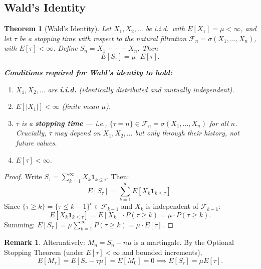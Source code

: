 \documentclass[12pt, a4paper]{article}
\theoremstyle{definition}
\newtheorem{remark}{Remark}[section]
\theoremstyle{plain}
\newtheorem{theorem}{Theorem}[section]
\begin{document}
\subsection{Wald's Identity}

\begin{theorem}[Wald's Identity]
Let $X_1, X_2, \ldots$ be i.i.d.\ with $E[X_1] = \mu < \infty$, and let $\tau$ be a stopping time with respect to the natural filtration $\mathcal{F}_n = \sigma(X_1,\ldots,X_n)$, with $E[\tau] < \infty$. Define $S_n = X_1 + \cdots + X_n$. Then
\[
  E[S_\tau] = \mu \cdot E[\tau].
\]

\textbf{Conditions required for Wald's identity to hold:}
\begin{enumerate}[label=(\roman*)]
  \item $X_1, X_2, \ldots$ are \textbf{i.i.d.} (identically distributed and mutually independent).
  \item $E[|X_1|] < \infty$ (finite mean $\mu$).
  \item $\tau$ is a \textbf{stopping time} — i.e., $\{\tau = n\} \in \mathcal{F}_n = \sigma(X_1,\ldots,X_n)$ for all $n$. Crucially, $\tau$ may depend on $X_1, X_2, \ldots$ but only through their history, not future values.
  \item $E[\tau] < \infty$.
\end{enumerate}
\end{theorem}

\begin{proof}
Write $S_\tau = \sum_{k=1}^\infty X_k \mathbf{1}_{k \leq \tau}$. Then:
\[
  E[S_\tau] = \sum_{k=1}^\infty E[X_k \mathbf{1}_{k \leq \tau}].
\]
Since $\{\tau \geq k\} = \{\tau \leq k-1\}^c \in \mathcal{F}_{k-1}$ and $X_k$ is independent of $\mathcal{F}_{k-1}$:
\[
  E[X_k \mathbf{1}_{k \leq \tau}] = E[X_k] \cdot P(\tau \geq k) = \mu \cdot P(\tau \geq k).
\]
Summing: $E[S_\tau] = \mu \sum_{k=1}^\infty P(\tau \geq k) = \mu \cdot E[\tau]$.
\end{proof}

\begin{remark}
Alternatively: $M_n = S_n - n\mu$ is a martingale. By the Optional Stopping Theorem (under $E[\tau] < \infty$ and bounded increments),
\[
  E[M_\tau] = E[S_\tau - \tau\mu] = E[M_0] = 0 \implies E[S_\tau] = \mu E[\tau].
\]
\end{remark}
\end{document}
